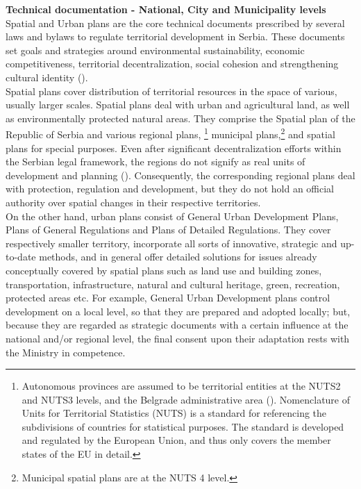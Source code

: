 \documentclass[11pt]{report}
\begin{document}
\textbf{Technical documentation - National, City and Municipality levels}
\\
Spatial and Urban plans are the core technical documents prescribed by several laws and bylaws to regulate territorial development in Serbia.
These documents set goals and strategies around environmental sustainability, economic competitiveness, territorial decentralization, social cohesion and strengthening cultural identity (\href{Hirt}{\citealt{hirt_belgrade_2009}}).
\\
Spatial plans cover distribution of territorial resources in the space of various, usually larger scales. Spatial plans deal with urban and agricultural land, as well as environmentally protected natural areas. They comprise the Spatial plan of the Republic of Serbia and various regional plans,
\footnote{Autonomous provinces are assumed to be territorial  entities  at  the  NUTS2  and NUTS3  levels,  and the Belgrade administrative  area (\href{Vujosevic}{\citealt{vujosevic_planning_2006}}). Nomenclature of Units for Territorial Statistics (NUTS) is a standard for referencing the subdivisions of countries for statistical purposes. The standard is developed and regulated by the European Union, and thus only covers the member states of the EU in detail.}
municipal plans,\footnote{Municipal  spatial plans are at the NUTS 4 level.}
and spatial plans for special purposes.
Even after significant decentralization efforts within the Serbian legal framework, the regions do not signify as real units of development and planning (\href{Vujosevic}{\citealt{vujosevic_regionalizam_2015}}). Consequently, the corresponding regional plans deal with protection, regulation and development, but they do not hold an official authority over spatial changes in their respective territories.
\\

On the other hand, urban plans consist of General Urban Development Plans, Plans of General Regulations and Plans of Detailed Regulations. They cover respectively smaller territory, incorporate all sorts of innovative, strategic and up-to-date methods, and in general offer detailed solutions for issues already conceptually covered by spatial plans such as land use and building zones, transportation, infrastructure, natural and cultural heritage, green, recreation, protected areas etc. For example, General Urban Development plans control development on a local level, so that they are prepared and adopted locally; but, because they are regarded as strategic documents with a certain influence at the national and/or regional level, the final consent upon their adaptation rests with the Ministry in competence. 
\\
\end{document}
